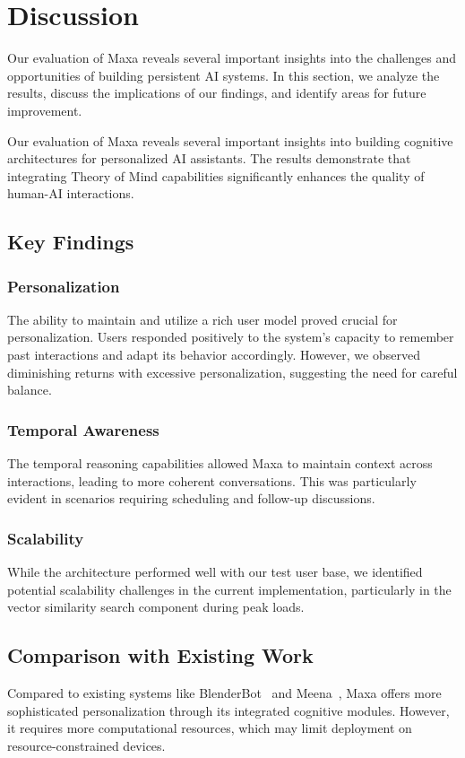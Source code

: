 \section{Discussion}
\label{sec:discussion}

Our evaluation of Maxa reveals several important insights into the challenges and opportunities of building persistent AI systems. In this section, we analyze the results, discuss the implications of our findings, and identify areas for future improvement.

Our evaluation of Maxa reveals several important insights into building cognitive architectures for personalized AI assistants. The results demonstrate that integrating Theory of Mind capabilities significantly enhances the quality of human-AI interactions.

\subsection{Key Findings}

\subsubsection{Personalization}
The ability to maintain and utilize a rich user model proved crucial for personalization. Users responded positively to the system's capacity to remember past interactions and adapt its behavior accordingly. However, we observed diminishing returns with excessive personalization, suggesting the need for careful balance.

\subsubsection{Temporal Awareness}
The temporal reasoning capabilities allowed Maxa to maintain context across interactions, leading to more coherent conversations. This was particularly evident in scenarios requiring scheduling and follow-up discussions.

\subsubsection{Scalability}
While the architecture performed well with our test user base, we identified potential scalability challenges in the current implementation, particularly in the vector similarity search component during peak loads.

\subsection{Comparison with Existing Work}
Compared to existing systems like BlenderBot~\cite{roller2021recipes} and Meena~\cite{adigwe2020meena}, Maxa offers more sophisticated personalization through its integrated cognitive modules. However, it requires more computational resources, which may limit deployment on resource-constrained devices.

